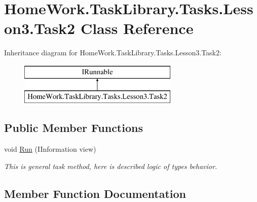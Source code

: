 \hypertarget{class_home_work_1_1_task_library_1_1_tasks_1_1_lesson3_1_1_task2}{}\section{Home\+Work.\+Task\+Library.\+Tasks.\+Lesson3.\+Task2 Class Reference}
\label{class_home_work_1_1_task_library_1_1_tasks_1_1_lesson3_1_1_task2}
Inheritance diagram for Home\+Work.\+Task\+Library.\+Tasks.\+Lesson3.\+Task2\+:\begin{figure}[H]
\begin{center}
\leavevmode
\includegraphics[height=2.000000cm]{class_home_work_1_1_task_library_1_1_tasks_1_1_lesson3_1_1_task2}
\end{center}
\end{figure}
\subsection*{Public Member Functions}
\begin{DoxyCompactItemize}
\item 
void \mbox{\hyperlink{class_home_work_1_1_task_library_1_1_tasks_1_1_lesson3_1_1_task2_a2854997aee3404efb50020ee4aec1560}{Run}} (I\+Information view)
\begin{DoxyCompactList}\small\item\em This is general task method, here is described logic of types behavior. \end{DoxyCompactList}\end{DoxyCompactItemize}


\subsection{Member Function Documentation}
\mbox{\label{class_home_work_1_1_task_library_1_1_tasks_1_1_lesson3_1_1_task2_a2854997aee3404efb50020ee4aec1560}} 
